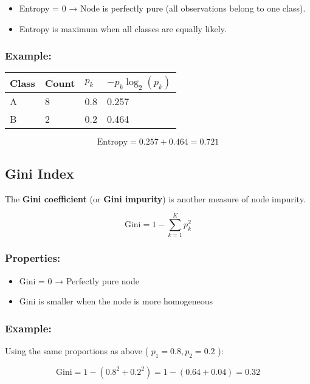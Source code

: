 \documentclass[
  letterpaper,
  DIV=11,
  numbers=noendperiod]{scrreprt}
\providecommand{\tightlist}{%
  \setlength{\itemsep}{0pt}\setlength{\parskip}{0pt}}\usepackage{longtable,booktabs,array}
\begin{document}
\begin{itemize}
\tightlist
\item
  Entropy = 0 → Node is perfectly pure (all observations belong to one
  class).
\item
  Entropy is maximum when all classes are equally likely.
\end{itemize}

\subsubsection{Example:}\label{example}

\begin{longtable}[]{@{}llll@{}}
\toprule\noalign{}
Class & Count & \(p_k\) & \(-p_k \log_2(p_k)\) \\
\midrule\noalign{}
\endhead
\bottomrule\noalign{}
\endlastfoot
A & 8 & 0.8 & 0.257 \\
B & 2 & 0.2 & 0.464 \\
\end{longtable}

\[
\text{Entropy} = 0.257 + 0.464 = 0.721
\]

\subsection{Gini Index}\label{gini-index}

The \textbf{Gini coefficient} (or \textbf{Gini impurity}) is another
measure of node impurity.

\[
\text{Gini} = 1 - \sum_{k=1}^{K} p_k^2
\]

\subsubsection{Properties:}\label{properties-1}

\begin{itemize}
\item
  Gini = 0 → Perfectly pure node
\item
  Gini is smaller when the node is more homogeneous
\end{itemize}

\subsubsection{Example:}\label{example-1}

Using the same proportions as above ( \(p_1 = 0.8, p_2 = 0.2\) ):

\[
\text{Gini} = 1 - (0.8^2 + 0.2^2) = 1 - (0.64 + 0.04) = 0.32
\]
\end{document}
